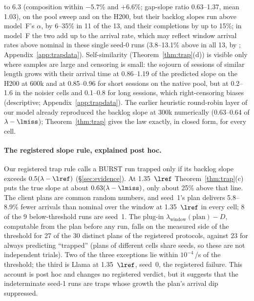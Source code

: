 to 6.3 (composition within $-5.7$\% and $+6.6$\%; gap-slope ratio 0.63--1.37, mean 1.03), on the pool sweep and on the H200, but
their backlog slopes run above model~F's $\alpha$, by 6--35\% in 11 of the 13, and their completions by up to 15\%; in
model~F the two add up to the arrival rate, which may reflect window arrival rates above nominal in these single seed-0 runs (3.8--13.1\%
above in all 13, by ; Appendix~\ref{app:trapdata}). Self-similarity (Theorem~\ref{thm:trap}(d)) is visible only where samples are large and censoring is
small: the sojourn of sessions of similar length grows with their arrival time at 0.86--1.19 of the predicted slope on the H200 at
600k and at 0.85--0.96 for short sessions on the native pool, but at 0.2--1.6 in the noisier cells and 0.1--0.8 for long sessions,
which right-censoring biases (descriptive; Appendix~\ref{app:trapdata}). The earlier heuristic round-robin layer of our model already reproduced the
backlog slope at 300k numerically (0.63--0.64 of $\lambda-\lmiss$); Theorem~\ref{thm:trap} gives the law exactly, in closed form, for every cell.

\paragraph{The registered slope rule, explained post hoc.} Our registered trap rule calls a BURST run trapped only if its
backlog slope exceeds $0.5(\lambda-\lref)$ (\S\ref{sec:evidence}). At 1.35~$\lref$ Theorem~\ref{thm:trap}(c) puts the true
slope at about $0.63(\lambda-\lmiss)$, only about 25\% above that line. The client plans are common random numbers, and seed~1's
plan delivers 5.8--8.9\% fewer arrivals than nominal over the window at 1.35~$\lref$ in every cell; 8 of the 9 below-threshold runs
are seed~1. The plug-in $\lambda_{\mathrm{window}}(\text{plan})-D$, computable from the plan before any run, falls on the measured
side of the threshold for 27 of the 30 distinct plans of the registered protocols, against 23 for always predicting ``trapped''
(plans of different cells share seeds, so these are not independent trials). Two of the three exceptions lie within
$10^{-4}$\,/s of the threshold; the third is Llama at 1.35~$\lref$, seed~0, the registered failure. This account is post hoc and
changes no registered verdict, but it suggests that the indeterminate seed-1 runs are traps whose growth the plan's arrival dip
suppressed.

